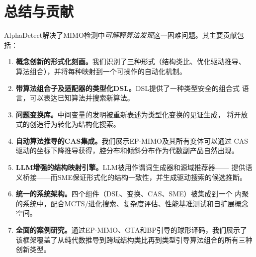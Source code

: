 \documentclass[12pt,a4paper]{article}
\begin{document}
\section{总结与贡献}
\label{sec:summary}

AlphaDetect解决了MIMO检测中\emph{可解释算法发现}这一困难问题。其主要贡献包括：

\begin{enumerate}[leftmargin=2em, itemsep=4pt]
  \item \textbf{概念创新的形式化刻画。}我们识别了三种形式（结构类比、优化驱动推导、
        算法组合），并将每种映射到一个可操作的自动化机制。

  \item \textbf{带算法组合子及适配器的类型化DSL。}DSL提供了一种类型安全的组合式
        语言，可以表达已知算法并搜索新算法。

  \item \textbf{问题变换库。}中间变量的发明被重新表述为类型化变换的见证生成，
        将开放式的创造行为转化为结构化搜索。

  \item \textbf{自动算法推导的CAS集成。}我们展示EP-MIMO及其所有变体可以通过
        CAS驱动的坐标下降推导获得，腔分布和倾斜分布作为代数副产品自然出现。

  \item \textbf{LLM增强的结构映射引擎。}LLM被用作谓词生成器和源域推荐器——
        提供语义桥接——而SME保证形式化的结构一致性，并生成驱动搜索的候选推断。

  \item \textbf{统一的系统架构。}四个组件（DSL、变换、CAS、SME）被集成到一个
        内聚的系统中，配合MCTS/进化搜索、复杂度评估、性能基准测试和自扩展概念空间。

  \item \textbf{全面的案例研究。}通过EP-MIMO、GTA和BP引导的球形译码，我们展示了
        该框架覆盖了从纯代数推导到跨域结构类比再到类型引导算法组合的所有三种
        创新类型。
\end{enumerate}
\end{document}
